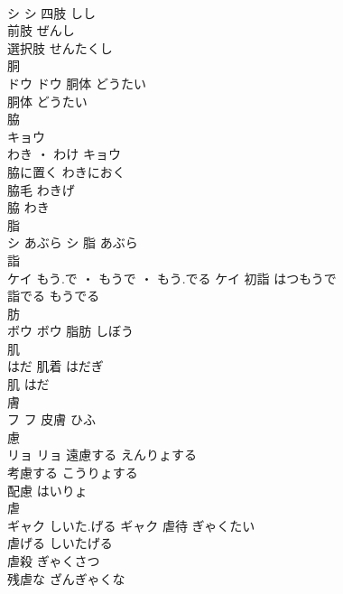 \documentclass[8pt]{extreport}
\begin{document}
\begin{CJK}{UTF8}{min}
\\	シ		シ	四肢	しし	
\\	前肢	ぜんし	
\\	選択肢	せんたくし	
\\	胴	
\\	ドウ		ドウ	胴体	どうたい	
\\	胴体	どうたい	
\\	脇	
\\	キョウ
\\	わき ・ わけ	キョウ
\\	脇に置く	わきにおく	
\\	脇毛	わきげ	
\\	脇	わき	
\\	脂	
\\	シ	あぶら	シ													脂	あぶら	
\\	詣	
\\	ケイ	もう.で ・ もうで ・ もう.でる	ケイ	初詣	はつもうで	
\\	詣でる	もうでる	
\\	肪	
\\	ボウ		ボウ													脂肪	しぼう	
\\	肌	
\\	はだ		肌着	はだぎ	
\\	肌	はだ	
\\	膚	
\\	フ		フ													皮膚	ひふ	
\\	慮	
\\	リョ		リョ	遠慮する	えんりょする	
\\	考慮する	こうりょする	
\\	配慮	はいりょ	
\\	虐	
\\	ギャク	しいた.げる	ギャク	虐待	ぎゃくたい	
\\	虐げる	しいたげる	
\\	虐殺	ぎゃくさつ	
\\	残虐な	ざんぎゃくな	
\end{CJK}
\end{document}

